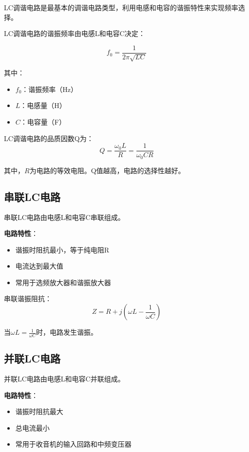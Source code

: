 LC调谐电路是最基本的调谐电路类型，利用电感和电容的谐振特性来实现频率选择。

LC调谐电路的谐振频率由电感L和电容C决定：

\begin{equation}
f_0 = \frac{1}{2\pi\sqrt{LC}}
\label{eq:lc_resonance_frequency}
\end{equation}

其中：
\begin{itemize}
    \item $f_0$：谐振频率（Hz）
    \item $L$：电感量（H）
    \item $C$：电容量（F）
\end{itemize}

LC调谐电路的品质因数Q为：
\[ Q = \frac{\omega_0 L}{R} = \frac{1}{\omega_0 CR} \]

其中，$R$为电路的等效电阻。Q值越高，电路的选择性越好。

\subsection{串联LC电路}
\label{sec:series_lc_circuit}

串联LC电路由电感L和电容C串联组成。

\textbf{电路特性}：
\begin{itemize}
    \item 谐振时阻抗最小，等于纯电阻R
    \item 电流达到最大值
    \item 常用于选频放大器和谐振放大器
\end{itemize}

串联谐振阻抗：
\begin{equation}
Z = R + j(\omega L - \frac{1}{\omega C})
\end{equation}

当$\omega L = \frac{1}{\omega C}$时，电路发生谐振。

\subsection{并联LC电路}
\label{sec:parallel_lc_circuit}

并联LC电路由电感L和电容C并联组成。

\textbf{电路特性}：
\begin{itemize}
    \item 谐振时阻抗最大
    \item 总电流最小
    \item 常用于收音机的输入回路和中频变压器
\end{itemize}

